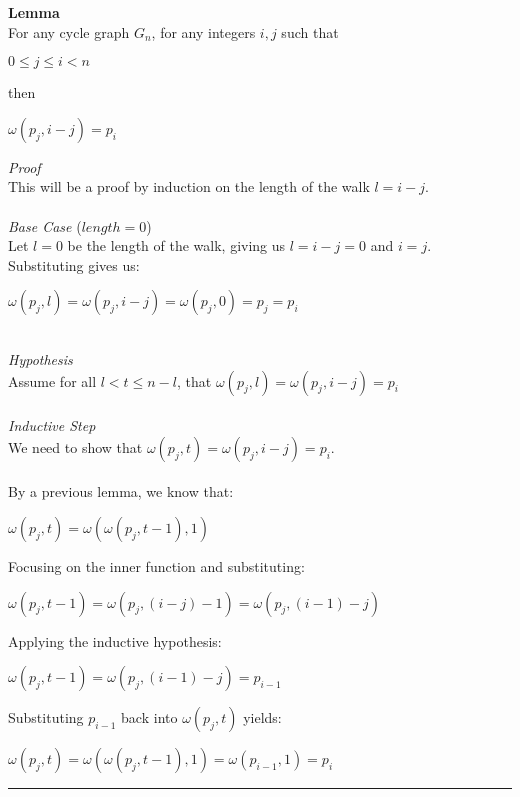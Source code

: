 \documentclass[a4paper,12pt]{article}
\begin{document}
\begin{tcolorbox}
\textbf{Lemma}\\
For any cycle graph $G_n$, for any integers $i, j$ such that
\begin{center}
$0 \leq j \leq i < n$
\end{center}
then
\begin{center}
$\omega(p_j, i - j) = p_i$
\end{center}
\end{tcolorbox}
\noindent
\textit{Proof}\\
This will be a proof by induction on the length of the walk $l = i - j$.\\
\\
\textit{Base Case} ($length = 0$)\\
Let $l = 0$ be the length of the walk, giving us $l = i - j = 0$ and $i = j$.\\
Substituting gives us:
\begin{center}
$\omega(p_j, l) = \omega(p_j, i - j) = \omega(p_j, 0) = p_j = p_i$
\end{center} 
\noindent
\\
\textit{Hypothesis}\\
Assume for all $l < t \leq n - l$, that $\omega(p_j, l) = \omega(p_j, i - j) = p_i$\\
\\
\textit{Inductive Step}\\
We need to show that $\omega(p_j, t) = \omega(p_j, i - j) = p_i$.\\
\\
By a previous lemma, we know that:
\begin{center}
$\omega(p_j, t) = \omega(\omega(p_j, t - 1), 1)$
\end{center}
Focusing on the inner function and substituting:
\begin{center}
$\omega(p_j, t - 1) = \omega(p_j, (i - j) - 1) = \omega(p_j, (i - 1) - j)$
\end{center}
Applying the inductive hypothesis:
\begin{center}
$\omega(p_j, t - 1) = \omega(p_j, (i - 1) - j) = p_{i-1}$
\end{center}
Substituting $p_{i-1}$ back into $\omega(p_j, t)$ yields:
\begin{center}
$\omega(p_j, t) = \omega(\omega(p_j, t - 1), 1) = \omega(p_{i-1}, 1) = p_i$
\end{center}

\begin{center}
\noindent\rule{8cm}{0.4pt}
\end{center}
\end{document}
